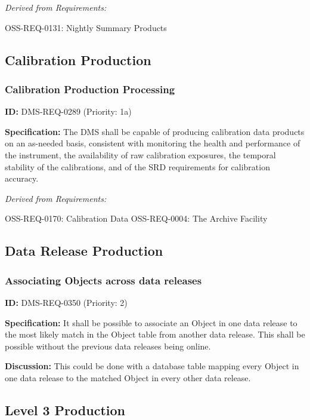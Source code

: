 \documentclass[SE,toc,lsstdraft]{lsstdoc}
\begin{document}
\emph{Derived from Requirements:}

OSS-REQ-0131:
Nightly Summary Products \newline

\subsection{Calibration Production}

\subsubsection{Calibration Production Processing}

\label{DMS-REQ-0289}
\textbf{ID:} DMS-REQ-0289 (Priority: 1a)

\textbf{Specification:} The DMS shall be capable of producing calibration data products on an as-needed basis, consistent with monitoring the health and performance of the instrument, the availability of raw calibration exposures, the temporal stability of the calibrations, and of the SRD requirements for calibration accuracy.

\emph{Derived from Requirements:}

OSS-REQ-0170:
Calibration Data \newline
OSS-REQ-0004:
The Archive Facility \newline

\subsection{Data Release Production}

\subsubsection{Associating Objects across data releases}

\label{DMS-REQ-0350}
\textbf{ID:} DMS-REQ-0350 (Priority: 2)

\textbf{Specification:} It shall be possible to associate an Object in one data release to the most likely match in the Object table from another data release. This shall be possible without the previous data releases being online.

\textbf{Discussion:} This could be done with a database table mapping every Object in one data release to the matched Object in every other data release.

\subsection{Level 3 Production}
\end{document}
